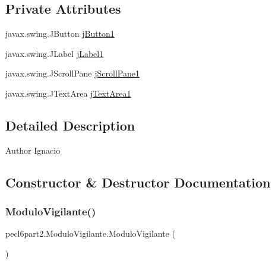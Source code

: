 \subsection*{Private Attributes}
\begin{DoxyCompactItemize}
\item 
javax.\+swing.\+J\+Button \mbox{\hyperlink{classpecl6part2_1_1_modulo_vigilante_a1e6500588306c2830853cb56b0e21c6a}{j\+Button1}}
\item 
javax.\+swing.\+J\+Label \mbox{\hyperlink{classpecl6part2_1_1_modulo_vigilante_a3997466e501d43312cb2638eb1f743c0}{j\+Label1}}
\item 
javax.\+swing.\+J\+Scroll\+Pane \mbox{\hyperlink{classpecl6part2_1_1_modulo_vigilante_a27f20917a0609de2eccd3550c9bfc8ca}{j\+Scroll\+Pane1}}
\item 
javax.\+swing.\+J\+Text\+Area \mbox{\hyperlink{classpecl6part2_1_1_modulo_vigilante_aafe6d08a0cded994a11a7d3dbf753f91}{j\+Text\+Area1}}
\end{DoxyCompactItemize}


\subsection{Detailed Description}
\begin{DoxyAuthor}{Author}
Ignacio 
\end{DoxyAuthor}


\subsection{Constructor \& Destructor Documentation}
\mbox{\label{classpecl6part2_1_1_modulo_vigilante_a1ae677df7d37e3ef8303a33e80513d0f}} 
\subsubsection{\texorpdfstring{Modulo\+Vigilante()}{ModuloVigilante()}}
{\footnotesize\ttfamily pecl6part2.\+Modulo\+Vigilante.\+Modulo\+Vigilante (\begin{DoxyParamCaption}{ }\end{DoxyParamCaption})\hspace{0.3cm}{\ttfamily [inline]}}

